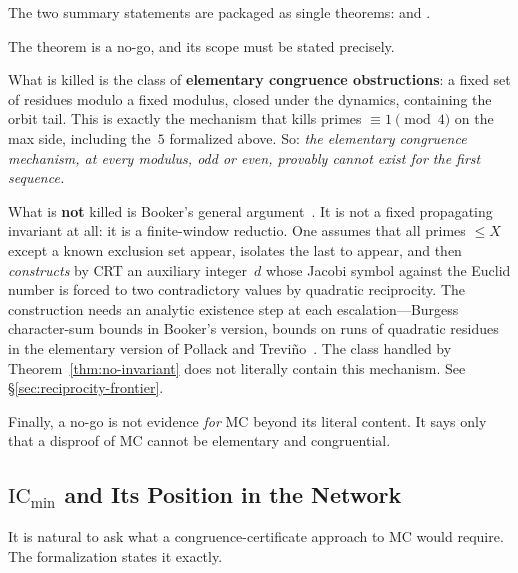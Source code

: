 \smallskip\noindent
The two summary statements are packaged as single theorems:
and
.

\begin{remark}
\label{rem:scope}
The theorem is a no-go, and its scope must be stated precisely.

What is killed is the class of \textbf{elementary congruence
obstructions}: a fixed set of residues modulo a fixed modulus, closed
under the dynamics, containing the orbit tail.  This is exactly the
mechanism that kills primes $\equiv 1 \pmod 4$ on the max side,
including the~$5$ formalized above.  So: \emph{the elementary congruence
mechanism, at every modulus, odd or even, provably cannot exist for the
first sequence.}

What is \textbf{not} killed is Booker's general
argument~\cite{Booker2012}.  It is not a fixed propagating invariant at
all: it is a finite-window reductio.  One assumes that all primes
$\leq X$ except a known exclusion set appear, isolates the last to
appear, and then \emph{constructs} by CRT an auxiliary integer~$d$ whose
Jacobi symbol against the Euclid number is forced to two contradictory
values by quadratic reciprocity.  The construction needs an analytic
existence step at each escalation---Burgess character-sum bounds in
Booker's version, bounds on runs of quadratic residues in the elementary
version of Pollack and Treviño~\cite{PollackTrevino2014}.  The class
handled by Theorem~\ref{thm:no-invariant} does not literally contain
this mechanism.  See \S\ref{sec:reciprocity-frontier}.

Finally, a no-go is not evidence \emph{for} MC beyond its literal
content.  It says only that a disproof of MC cannot be elementary and
congruential.
\end{remark}

\subsection{$\mathrm{IC}_{\min}$ and Its Position in the Network}
\label{sec:ic-min}

It is natural to ask what a congruence-certificate approach to MC would
require.  The formalization states it exactly.

